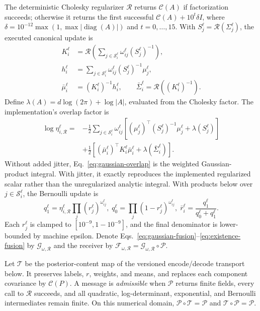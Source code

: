 The deterministic Cholesky regularizer $\mathcal R$ returns $\mathcal C(A)$ if
factorization succeeds; otherwise it returns the first successful
$\mathcal C(A)+10^t\delta I$, where
$\delta=10^{-12}\max(1,\max|\operatorname{diag}(A)|)$ and $t=0,\ldots,15$.
With $S_j^\ell=\mathcal R(\Sigma_j^\ell)$, the executed canonical update is
\begin{equation}
\begin{split}
 K_i^\ell&=\mathcal R\!\left(\sum_{j\in\mathcal S_i^\ell}
 \omega_{ij}^\ell(S_j^\ell)^{-1}\right),\\
 h_i^\ell&=\sum_{j\in\mathcal S_i^\ell}\omega_{ij}^\ell
 (S_j^\ell)^{-1}\mu_j^\ell,\\
 \bar\mu_i^\ell&=(K_i^\ell)^{-1}h_i^\ell,\qquad
 \bar\Sigma_i^\ell=\mathcal R((K_i^\ell)^{-1}).
\end{split}
 \label{eq:gaussian-fusion}
\end{equation}
Define $\lambda(A)=d\log(2\pi)+\log|A|$, evaluated from the Cholesky factor.
The implementation's overlap factor is
\begin{equation}
\begin{split}
 \log\eta_{i,\mathcal R}^\ell={}&-\frac12
 \sum_{j\in\mathcal S_i^\ell}\omega_{ij}^\ell
 \left[(\mu_j^\ell)^\top(S_j^\ell)^{-1}\mu_j^\ell+
 \lambda(S_j^\ell)\right]\\
 &+\frac12\left[(\bar\mu_i^\ell)^\top K_i^\ell\bar\mu_i^\ell+
 \lambda(\bar\Sigma_i^\ell)\right].
\end{split}
 \label{eq:gaussian-overlap}
\end{equation}
Without added jitter, Eq.~\eqref{eq:gaussian-overlap} is the weighted Gaussian-
product integral. With jitter, it exactly reproduces the implemented regularized
scalar rather than the unregularized analytic integral.
With products below over $j\in\mathcal S_i^\ell$, the Bernoulli update is
\begin{equation}
 q_1^\ell=\eta_{i,\mathcal R}^\ell
 \prod_j(r_j^\ell)^{\omega_{ij}^\ell},\;
 q_0^\ell=\prod_j(1-r_j^\ell)^{\omega_{ij}^\ell},\;
 \bar r_i^\ell=\frac{q_1^\ell}{q_0^\ell+q_1^\ell}.
 \label{eq:existence-fusion}
\end{equation}
Each $r_j^\ell$ is clamped to $[10^{-9},1-10^{-9}]$, and the final denominator
is lower-bounded by machine epsilon. Denote
Eqs.~\eqref{eq:gaussian-fusion}--\eqref{eq:existence-fusion} by
$\mathcal G_{\omega,\mathcal R}$ and the receiver by
$\mathcal F_{\omega,\mathcal R}=\mathcal G_{\omega,\mathcal R}\circ\mathcal P$.

Let $\mathcal T$ be the posterior-content map of the versioned encode/decode
transport below. It preserves labels, $r$, weights, and means, and replaces each
component covariance by $\mathcal C(P)$. A message is \emph{admissible} when
$\mathcal P$ returns finite fields, every call to $\mathcal R$ succeeds, and all
quadratic, log-determinant, exponential, and Bernoulli intermediates remain
finite. On this numerical domain,
$\mathcal P\circ\mathcal T=\mathcal P$ and
$\mathcal T\circ\mathcal P=\mathcal P$.

